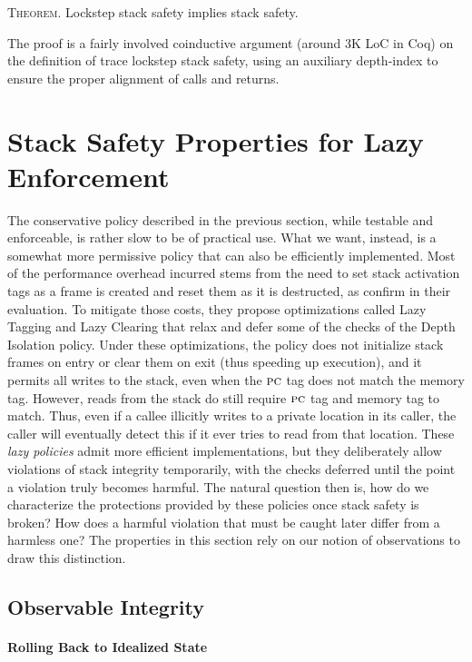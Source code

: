 \documentclass[acmsmall,review,anonymous]{acmart}\settopmatter{printfolios=true,printccs=false,printacmref=false}
\begin{document}
{\medskip
\textsc{Theorem.}
Lockstep stack safety implies stack safety.
\smallskip

The proof is a fairly involved coinductive argument
(around 3K LoC in Coq) on the definition of trace lockstep stack safety,
using an auxiliary depth-index to ensure the proper alignment of
calls and returns.

\section{Stack Safety Properties for Lazy Enforcement}
\label{sec:lazy}

The conservative policy described in the previous section, while
testable and enforceable, is rather slow to be of practical use. What
we want, instead, is a somewhat more permissive policy that can also
be efficiently implemented. Most of the performance overhead incurred
stems from the need to set stack activation tags as a frame is created
and reset them as it is destructed, as
\citet{DBLP:conf/sp/RoesslerD18} confirm in their evaluation. To
mitigate those costs, they propose optimizations called Lazy Tagging and
Lazy Clearing that relax and defer some of the checks of the Depth Isolation
policy. Under these optimizations, the policy does not initialize stack
frames on entry or clear them on exit (thus speeding up execution),
and it permits all writes to the stack, even when the $\textsc{pc}$ tag
does not match the memory tag.
However, reads from the stack do still require $\textsc{pc}$ tag and memory tag
to match. Thus, even if a callee illicitly writes to a private location
in its caller, the caller will eventually detect this if it ever tries to read from
that location.
%
These \emph{lazy policies} admit more efficient implementations, but
they deliberately allow violations of stack integrity temporarily,
with the checks deferred until the point a violation truly becomes
harmful. The natural question then is, how do we characterize the
protections provided by these policies once stack safety is broken?
How does a harmful violation that must be caught later differ from a
harmless one? The properties in this section rely on our notion of
observations to draw this distinction.

\subsection{Observable Integrity}

\paragraph{Rolling Back to Idealized State}

}
\end{document}
